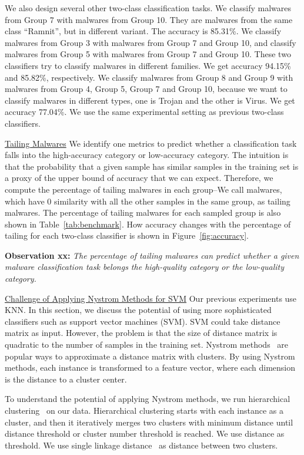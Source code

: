 We also design several other two-class classification tasks. 
We classify malwares from Group 7 with malwares from Group 10. 
They are malwares from the same class ``Ramnit'', but in different variant. 
The accuracy is 85.31\%. 
We classify malwares from Group 3 with malwares from Group 7 and Group 10, 
and classify malwares from Group 5 with malwares from Group 7 and Group 10. 
These two classifiers try to classify malwares in different families. 
We get accuracy 94.15\% and 85.82\%, respectively. 
We classify malwares from Group 8 and Group 9 with malwares from Group 4, Group 5, Group 7 and Group 10, 
because we want to classify malwares in different types, one is Trojan and the other is Virus. We get accuracy 77.04\%. 
We use the same experimental setting as previous two-class classifiers.  

\underline{Tailing Malwares}
We identify one metrics to predict whether
a classification task falls into the
high-accuracy category or low-accuracy
category. The intuition is that the probability
that a given sample has similar samples in
the training set is a proxy of the upper bound
of accuracy that we can expect. Therefore,
we compute the percentage of tailing malwares in each group--We call malwares, which have 0 similarity with all the other samples in the same group, as tailing malwares. 
The percentage of tailing malwares for each sampled group is also shown in Table~\ref{tab:benchmark}. 
How accuracy changes with the percentage of tailing for each two-class classifier is shown in Figure~\ref{fig:accuracy}. 

{\bf Observation xx:} 
{\em The percentage of tailing malwares
can predict whether a given malware classification task belongs
the high-quality category or the low-quality
category.}



\underline{Challenge of Applying Nystrom Methods for SVM}
Our previous experiments use KNN.
In this section, we discuss the potential of using
more sophisticated classifiers such as
support vector machines (SVM). 
SVM could take distance matrix as input.
However, the problem is that the size of distance matrix is quadratic to the number of samples in the training set. 
Nystrom methods~\cite{clustering-purpose} are popular ways to
approximate a distance matrix with clusters.
By using Nystrom methods, each instance is transformed to a feature vector, where each dimension is the distance to a cluster center. 

To understand the potential of applying Nystrom methods, we run hierarchical clustering~\cite{hcluster} on our data.
Hierarchical clustering starts with each instance as a cluster, 
and then it iteratively merges two clusters with minimum distance 
until distance threshold or cluster number threshold is reached. 
We use distance as threshold. 
We use single linkage distance~\cite{single-link} as distance between two clusters. 

